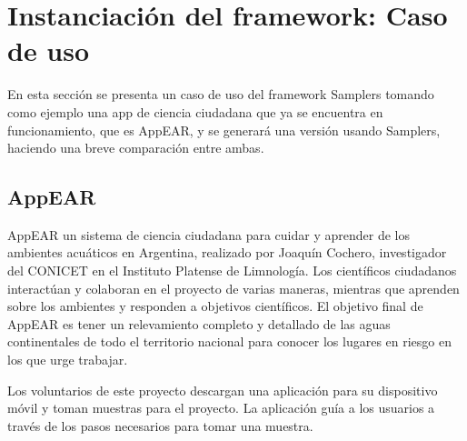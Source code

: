 \chapter{Instanciación del framework: Caso de uso}

En esta sección se presenta un caso de uso del framework Samplers tomando como ejemplo una app de ciencia ciudadana que ya se encuentra en funcionamiento, que es AppEAR, y se generará una versión usando Samplers, haciendo una breve comparación entre ambas.

\section{AppEAR}
AppEAR un sistema de ciencia ciudadana para cuidar y aprender de los ambientes acuáticos en Argentina, realizado por Joaquín Cochero, investigador del CONICET en el Instituto Platense de Limnología. Los científicos ciudadanos interactúan y colaboran en el proyecto de varias maneras, mientras que aprenden sobre los ambientes y responden a objetivos científicos. El objetivo final de AppEAR es tener un relevamiento completo y detallado de las aguas continentales de todo el territorio nacional para conocer los lugares en riesgo en los que urge trabajar. 

Los voluntarios de este proyecto descargan una aplicación para su dispositivo móvil y toman muestras para el proyecto. La aplicación guía a los usuarios a través de los pasos necesarios para tomar una muestra.\cite{appEar}

